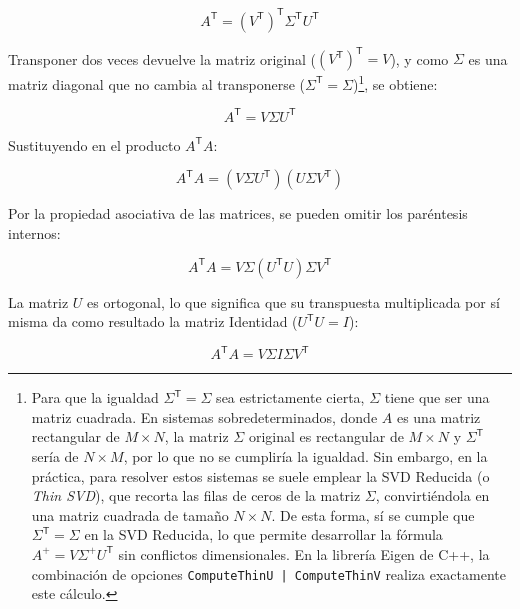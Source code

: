 \documentclass[11pt,a4paper]{article}
\newcommand{\trans}{\mathsf{T}}      %
\begin{document}
\begin{equation}
    A^{\trans} = (V^{\trans})^{\trans} \Sigma^{\trans} U^{\trans}
\end{equation}

Transponer dos veces devuelve la matriz original (\((V^{\trans})^{\trans} = V\)), y como \(\Sigma\) es una matriz diagonal que no cambia al transponerse (\(\Sigma^{\trans} = \Sigma\))\footnote{Para que la igualdad \(\Sigma^{\trans} = \Sigma\) sea estrictamente cierta, \(\Sigma\) tiene que ser una matriz cuadrada. En sistemas sobredeterminados, donde \(A\) es una matriz rectangular de \(M \times N\), la matriz \(\Sigma\) original es rectangular de \(M \times N\) y \(\Sigma^{\trans}\) sería de \(N \times M\), por lo que no se cumpliría la igualdad. Sin embargo, en la práctica, para resolver estos sistemas se suele emplear la SVD Reducida (o \textit{Thin SVD}), que recorta las filas de ceros de la matriz \(\Sigma\), convirtiéndola en una matriz cuadrada de tamaño \(N \times N\). De esta forma, sí se cumple que \(\Sigma^{\trans} = \Sigma\) en la SVD Reducida, lo que permite desarrollar la fórmula \(A^+ = V \Sigma^+ U^{\trans}\) sin conflictos dimensionales. En la librería Eigen de C++, la combinación de opciones \texttt{ComputeThinU | ComputeThinV} realiza exactamente este cálculo.}, se obtiene:

\begin{equation}
    A^{\trans} = V \Sigma U^{\trans}
\end{equation}

Sustituyendo en el producto \(A^{\trans} A\):

\begin{equation}
    A^{\trans} A = (V \Sigma U^{\trans}) (U \Sigma V^{\trans})
\end{equation}

Por la propiedad asociativa de las matrices, se pueden omitir los paréntesis internos:

\begin{equation}
    A^{\trans} A = V \Sigma (U^{\trans} U) \Sigma V^{\trans}
\end{equation}

La matriz \(U\) es ortogonal, lo que significa que su transpuesta multiplicada por sí misma da como resultado la matriz Identidad (\(U^{\trans} U = I\)):

\begin{equation}
    A^{\trans} A = V \Sigma I \Sigma V^{\trans}
\end{equation}
\end{document}
